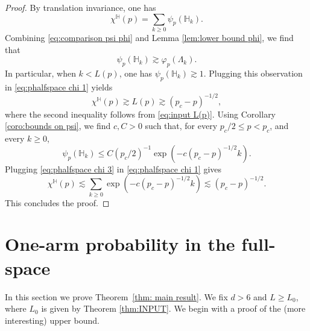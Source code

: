 \documentclass[11pt,a4paper]{article}
\numberwithin{equation}{section}
\theoremstyle{plain}
\theoremstyle{definition}
\newcommand{\1}{\mathbf 1}
\begin{document}
\begin{proof} By translation invariance, one has
\begin{equation}\label{eq:phalfspace chi 1}
	\chi^{\mathbb H}(p)= \sum_{k\geq 0}\psi_p(\mathbb H_k).
\end{equation}
Combining \eqref{eq:comparison psi phi} and Lemma \ref{lem:lower bound phi}, we find that
\begin{equation}
	\psi_p(\mathbb H_k)\gtrsim \varphi_{p}(\Lambda_k).
\end{equation}
In particular, when $k<L(p)$, one has $\psi_p(\mathbb H_k)\gtrsim 1$. Plugging this observation in \eqref{eq:phalfspace chi 1} yields
\begin{equation}\label{eq:phalfspace chi 2}
	\chi^{\mathbb H}(p)\gtrsim L(p) \gtrsim (p_c-p)^{-1/2},
\end{equation}
where the second inequality follows from \eqref{eq:input L(p)}. Using Corollary \ref{coro:bounds on psi}, we find $c,C>0$ such that, for every $p_c/2\leq p<p_c$, and every $k\geq 0$, 
\begin{equation}\label{eq:phalfspace chi 3}
	\psi_{p}(\mathbb H_k)\leq C(p_c/2)^{-1}\exp\left(-c(p_c-p)^{-1/2}k\right).
\end{equation}
Plugging \eqref{eq:phalfspace chi 3} in \eqref{eq:phalfspace chi 1} gives
\begin{equation}
	\chi^{\mathbb H}(p)\lesssim \sum_{k\geq 0}\exp\left(-c(p_c-p)^{-1/2}k\right)\lesssim (p_c-p)^{-1/2}.
	\end{equation}
	This concludes the proof.
\end{proof}


\section{One-arm probability in the full-space}\label{sec:onearmfull}

In this section we prove Theorem~\ref{thm: main result}. We fix $d>6$ and $L\geq L_0$, where $L_0$ is given by Theorem \ref{thm:INPUT}. We begin with a proof of the (more interesting) upper bound.
\end{document}
